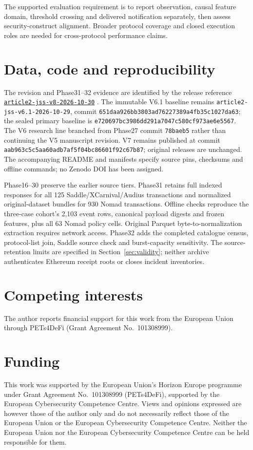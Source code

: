 \documentclass[preprint,12pt,authoryear]{elsarticle}
\begin{document}
The supported evaluation requirement is to report observation, causal feature domain, threshold crossing and delivered notification separately, then assess security-construct alignment. Broader protocol coverage and closed execution roles are needed for cross-protocol performance claims.

\section*{Data, code and reproducibility}
The revision and Phase31--32 evidence are identified by the release reference \href{https://github.com/KuznetsovKarazin/blockchain-analytics-lab/tree/article2-jss-v8-2026-10-30}{\texttt{article2-jss-v8-2026-10-30}} \citep{Kuznetsov2026Artifacts}. The immutable V6.1 baseline remains \texttt{article2-jss-v6.1-2026-10-29}, commit \texttt{651daa926bb3803ad76227389a4fb35c1027da63}; the sealed primary baseline is \texttt{e720697bc3986dd291a7047c580cf973ae6e5567}. The V6 research line branched from Phase27 commit \texttt{78baeb5} rather than continuing the V5 manuscript revision. V7 remains published at commit \texttt{aab963c5c5aa60adb7af5f04bc86601f92c67b87}; original releases are unchanged. The accompanying README and manifests specify source pins, checksums and offline commands; no Zenodo DOI has been assigned.

Phase16--30 preserve the earlier source tiers. Phase31 retains full indexed responses for all 125 Saddle/XCarnival/Audius transactions and normalized original-dataset bundles for 930 Nomad transactions. Offline checks reproduce the three-case cohort's 2,103 event rows, canonical payload digests and frozen features, plus all 63 Nomad policy cells. Original Parquet byte-to-normalization extraction requires network access. Phase32 adds the completed catalogue census, protocol-list join, Saddle source check and burst-capacity sensitivity. The source-retention limits are specified in Section~\ref{sec:validity}; neither archive authenticates Ethereum receipt roots or closes incident inventories.

\section*{Competing interests}
The author reports financial support for this work from the European Union through PETs4DeFi (Grant Agreement No.~101308999).
\section*{Funding}
This work was supported by the European Union's Horizon Europe programme under Grant Agreement No.~101308999 (PETs4DeFi), supported by the European Cybersecurity Competence Centre. Views and opinions expressed are however those of the author only and do not necessarily reflect those of the European Union or the European Cybersecurity Competence Centre. Neither the European Union nor the European Cybersecurity Competence Centre can be held responsible for them.
\end{document}
